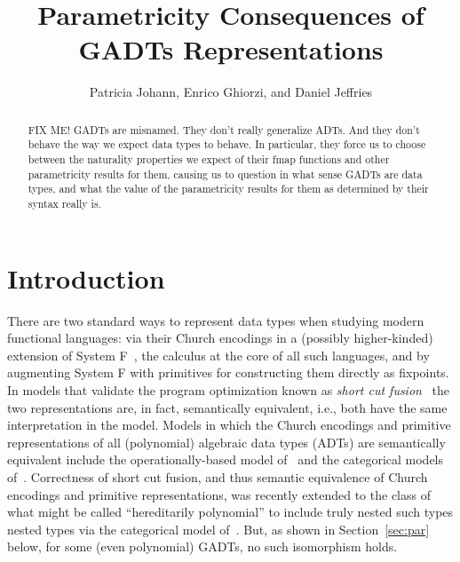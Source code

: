 \documentclass[acmsmall,screen,review,anonymous]{acmart}
\title[Parametricity Consequences of GADTs
  Representations]{Parametricity Consequences of GADTs
  Representations}
\author{Patricia Johann, Enrico Ghiorzi, and Daniel Jeffries}
\affiliation{ \institution{Appalachian State University}}
\theoremstyle{definition}
\begin{document}
\begin{abstract}
{\color{red} FIX ME!} GADTs are misnamed. They don't really generalize
ADTs. And they don't behave the way we expect data types to behave. In
particular, they force us to choose between the naturality properties
we expect of their fmap functions and other parametricity results for
them, causing us to question in what sense GADTs are data types, and
what the value of the parametricity results for them as determined by
their syntax really is.
\end{abstract}

\maketitle

\section{Introduction}

There are two standard ways to represent data types when studying
modern functional languages: via their Church encodings in a (possibly
higher-kinded) extension of System F~\cite{gir72}, the calculus at the
core of all such languages, and by augmenting System F
with primitives for constructing them directly as fixpoints.
In models that validate the program optimization known as {\em short
  cut fusion}~\cite{glp93} the two representations are, in fact,
semantically equivalent, i.e., both have the same interpretation in
the model. Models in which the Church encodings and primitive
representations of all {\color{blue} (polynomial)} algebraic data
types (ADTs) are semantically equivalent include the
operationally-based model of~\cite{pit98,pit00} and the categorical
models of~\cite{joh02,joh03}.
Correctness of short cut fusion, and thus semantic equivalence of
Church encodings and primitive representations, was recently extended
to the class of what might be called ``hereditarily polynomial''
{\color{blue} to include truly nested such types} nested types via the
categorical model of~\cite{jgj21}. But, as shown in
Section~\ref{sec:par} below, for some {\color{blue} (even polynomial)}
GADTs,
no such isomorphism holds.
\end{document}
